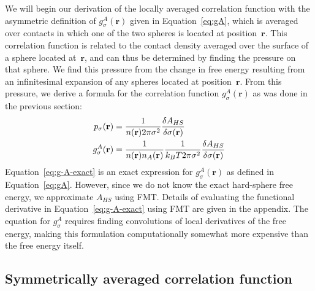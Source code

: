 \documentclass[letterpaper,amsmath,amssymb,10pt,pre]{revtex4-1}
\newcommand{\rr}{\textbf{r}}
\newcommand{\derivation}[1]{} %
\begin{document}
We will begin our derivation of the locally averaged correlation
function with the asymmetric definition of $g_\sigma^A(\rr)$ given in
Equation~\ref{eq:gA}, which is averaged over contacts in which one of
the two spheres is located at position~$\rr$.  This correlation
function is related to the contact density averaged over the surface
of a sphere located at~$\rr$, and can thus be determined by finding
the pressure on that sphere.  We find this pressure from the change in
free energy resulting from an infinitesimal expansion of any
spheres located at position~$\rr$.  From this pressure, we derive a
formula for the correlation function $g_\sigma^A(\rr)$ as was done in
the previous section:
\begin{align}
  p_\sigma(\mathbf{r}) &= \frac{1}{n(\rr) 2\pi \sigma^2} \frac{\delta
    A_{HS}}{\delta \sigma(\mathbf{r})} \label{eq:p_{HS}^A}\\
  g_\sigma^A(\rr)%
  &= \frac{1}{n(\rr) n_A(\rr)}\frac{1}{ k_BT 2\pi \sigma^2} \frac{\delta
    A_{HS}}{\delta \sigma(\mathbf{r})} \label{eq:g-A-exact}
\end{align}
Equation~\ref{eq:g-A-exact} is an exact expression for
$g_\sigma^A(\rr)$ as defined in Equation~\ref{eq:gA}.  However, since
we do not know the exact hard-sphere free energy, we approximate
$A_{HS}$ using FMT.  Details of evaluating the functional derivative
in Equation~\ref{eq:g-A-exact} using FMT are given in the appendix.
The equation for $g_\sigma^A$ requires finding convolutions of local
derivatives of the free energy, making this formulation
computationally somewhat more expensive than the free energy itself.

\derivation{
  \end{widetext}
}

\subsection{Symmetrically averaged correlation function}\label{sec:g-S}
\end{document}
